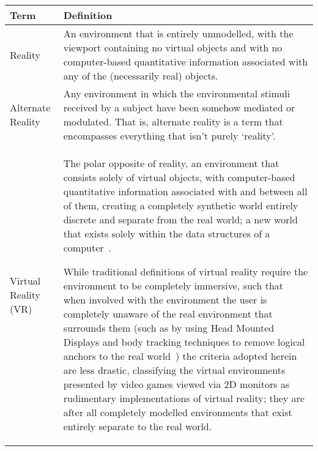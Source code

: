 \begin{center}
\begin{longtable}{ l p{10cm} }

\toprule

\textbf{Term} & \textbf{Definition} \\

\midrule

		
Reality & An environment that is entirely unmodelled, with the viewport containing no virtual objects and with no computer-based quantitative information associated with any of the (necessarily real) objects. \\
		
\midrule
		

Alternate Reality & Any environment in which the environmental stimuli received by a subject have been somehow mediated or modulated. That is, alternate reality is a term that encompasses everything that isn't purely `reality'. \\

\midrule
		
		
Virtual Reality (VR) & The polar opposite of reality, an environment that consists solely of virtual objects, with computer-based quantitative information associated with and between all of them, creating a completely synthetic world entirely discrete and separate from the real world; a new world that exists solely within the data structures of a computer~\cite{Milgram1994, Milgram1999, Want2009}.

While traditional definitions of virtual reality require the environment to be completely immersive, such that when involved with the environment the user is completely unaware of the real environment that surrounds them (such as by using Head Mounted Displays and body tracking techniques to remove logical anchors to the real world~\cite{Druck2006}) the criteria adopted herein are less drastic, classifying the virtual environments presented by video games viewed via 2D monitors as rudimentary implementations of virtual reality; they are after all completely modelled environments that exist entirely separate to the real world. \\
		

\end{longtable}
\end{center}
